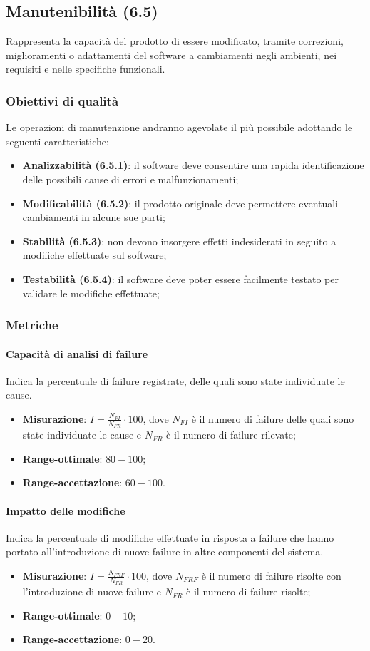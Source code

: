 \begin{itemize}
\subsection{Manutenibilità (6.5)}
Rappresenta la capacità del prodotto di essere modificato, tramite correzioni, miglioramenti o adattamenti del software a cambiamenti negli ambienti, nei requisiti e nelle specifiche funzionali.
\subsubsection{Obiettivi di qualità}
Le operazioni di manutenzione andranno agevolate il più possibile adottando le seguenti caratteristiche:
\begin{itemize}
\item \textbf{Analizzabilità (6.5.1)}: il software deve consentire una rapida identificazione delle possibili cause di errori e malfunzionamenti;
\item \textbf{Modificabilità (6.5.2)}: il prodotto originale deve permettere eventuali cambiamenti in alcune sue parti;
\item \textbf{Stabilità (6.5.3)}: non devono insorgere effetti indesiderati in seguito a modifiche effettuate sul software;
\item \textbf{Testabilità (6.5.4)}: il software deve poter essere facilmente testato per validare le modifiche effettuate;
\end{itemize}
\subsubsection{Metriche}
\paragraph{Capacità di analisi di failure}
Indica la percentuale di failure registrate, delle quali sono state individuate le cause.
\begin{itemize}
\item \textbf{Misurazione}: $I=\frac{N_{FI}}{N_{FR}} \cdot 100$, dove $N_{FI}$ è il numero di failure delle quali sono state individuate le cause e $N_{FR}$ è il numero di failure rilevate;
\item \textbf{Range-ottimale}: $80 - 100$;
\item \textbf{Range-accettazione}: $60 - 100$.
\end{itemize}
\paragraph{Impatto delle modifiche}
Indica la percentuale di modifiche effettuate in risposta a failure che hanno portato all'introduzione di nuove failure in altre componenti del sistema.
\begin{itemize}
\item \textbf{Misurazione}: $I=\frac{N_{FRF}}{N_{FR}} \cdot 100$, dove $N_{FRF}$ è il numero di failure risolte con l'introduzione di nuove failure e $N_{FR}$ è il numero di failure risolte;
\item \textbf{Range-ottimale}: $0 - 10$;
\item \textbf{Range-accettazione}: $0 - 20$.
\end{itemize}


\end{itemize}

